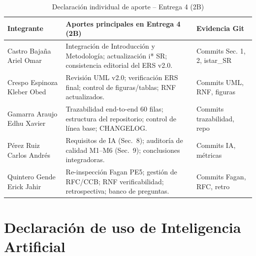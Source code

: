 \documentclass[11pt,a4paper]{article}
\begin{document}
\begin{longtable}{|p{3cm}|p{7cm}|p{4cm}|}
\caption{Declaración individual de aporte -- Entrega 4 (2B)}\\
\hline
\textbf{Integrante} & \textbf{Aportes principales en Entrega 4 (2B)} & \textbf{Evidencia Git} \\
\hline
Castro Bajaña Ariel Omar & Integración de Introducción y Metodología; actualización i* SR; consistencia editorial del ERS v2.0. & Commits Sec. 1, 2, istar\_SR \\
\hline
Crespo Espinoza Kleber Obed & Revisión UML v2.0; verificación ERS final; control de figuras/tablas; RNF actualizados. & Commits UML, RNF, figuras \\
\hline
Gamarra Araujo Edhu Xavier & Trazabilidad end-to-end 60 filas; estructura del repositorio; control de línea base; CHANGELOG. & Commits trazabilidad, repo \\
\hline
Pérez Ruiz Carlos Andrés & Requisitos de IA (Sec.~8); auditoría de calidad M1--M6 (Sec.~9); conclusiones integradoras. & Commits IA, métricas \\
\hline
Quintero Gende Erick Jahir & Re-inspección Fagan PE5; gestión de RFC/CCB; RNF verificabilidad; retrospectiva; banco de preguntas. & Commits Fagan, RFC, retro \\
\hline
\end{longtable}

\section{Declaración de uso de Inteligencia Artificial}
\end{document}
